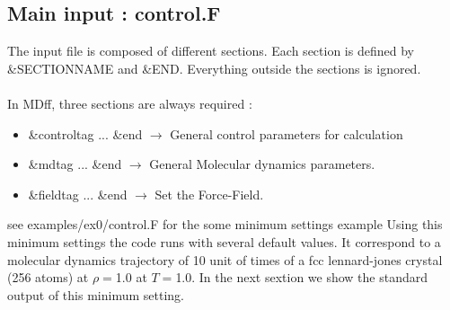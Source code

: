 \documentclass[a4paper,8pt]{article}
\newcommand{\MDFF}{{\sc MDff}}
\begin{document}
\subsection{Main input : control.F}

The input file is composed of different sections. 
Each section is defined by  \&SECTIONNAME and \&END.
Everything outside the sections is ignored.
\\
\\
In \MDFF, three sections are always required :

\begin{itemize}
\item \&controltag ... \&end $\rightarrow$ General control parameters for calculation 
\item \&mdtag ... \&end      $\rightarrow$ General Molecular dynamics parameters.
\item \&fieldtag ... \&end   $\rightarrow$ Set the Force-Field.
\end{itemize}

see examples/ex0/control.F for the some minimum settings example
Using this minimum settings the code runs with several default values.
It correspond to a molecular dynamics trajectory of 10 unit of times of a fcc lennard-jones 
crystal (256 atoms) at $\rho=$1.0 at $T=$1.0. In the next sextion we show the standard output of this minimum setting. 

\clearpage
\end{document}
